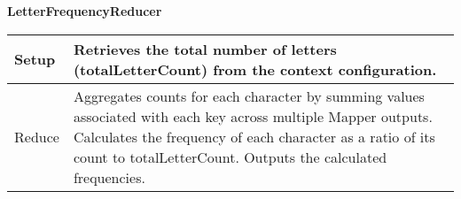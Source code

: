 \textbf{LetterFrequencyReducer}
\begin{longtable}{|>{\raggedright\arraybackslash}p{}|>{\raggedright\arraybackslash}p{}|}
    \hline
    Setup & Retrieves the total number of letters (totalLetterCount) from the context configuration. \\
    \hline
    Reduce & Aggregates counts for each character by summing values associated with each key across multiple Mapper outputs.
    Calculates the frequency of each character as a ratio of its count to totalLetterCount.
    Outputs the calculated frequencies.\\
    \hline
\end{longtable}













